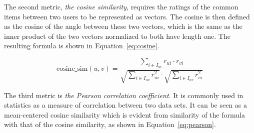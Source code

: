 %
%
%

The second metric, \textit{the cosine similarity}, requires the ratings of the common items between two users to be represented as vectors.
The cosine is then defined as the cosine of the angle between these two vectors, which is the same as the inner product of the two vectors normalized to both have length one.
The resulting formula is shown in Equation~\ref{eq:cosine}.

\begin{equation}
    \label{eq:cosine}
    \text{cosine\_sim}(u,v) = \frac{\sum\limits_{i \in I_{uv}} r_{ui} \cdot r_{vi}}{\sqrt{\sum\limits_{i \in I_{uv}} r_{ui}^2}\cdot\sqrt{\sum\limits_{i \in I_{uv}} r_{vi}^2}}
\end{equation}

The third metric is \textit{the Pearson correlation coefficient}.
It is commonly used in statistics as a measure of correlation between two data sets.
It can be seen as a mean-centered cosine similarity which is evident from similarity of the formula with that of the cosine similarity, as shown in Equation~\ref{eq:pearson}.

